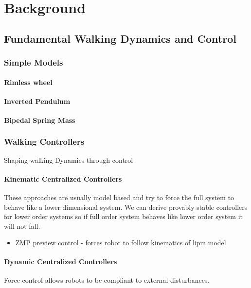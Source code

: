 \chapter{Background}

\section{Fundamental Walking Dynamics and Control}\label{sec:walking_review}
\subsection{Simple Models}
\subsubsection{Rimless wheel}
\subsubsection{Inverted Pendulum}
\subsubsection{Bipedal Spring Mass}

\subsection{Walking Controllers}
Shaping walking Dynamics through control

\subsubsection{Kinematic Centralized Controllers}

These approaches are usually model based and try to force the full system to
behave like a lower dimensional system. We can derive provably stable
controllers for lower order systems so if full order system behaves like lower
order system it will not fall.

\begin{itemize}
    \item ZMP preview control - forces robot to follow kinematics of lipm
    model
\end{itemize}

\subsubsection{Dynamic Centralized Controllers}
Force control allows robots to be compliant to external disturbances.

